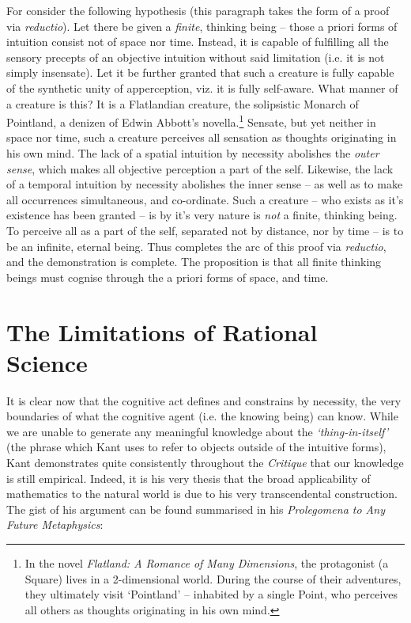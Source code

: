 \noindent
For consider the following hypothesis (this paragraph takes the form of a proof via \emph{reductio}). Let there be given a \emph{finite}, thinking being -- those a priori forms of intuition consist not of space nor time. Instead, it is capable of fulfilling all the sensory precepts of an objective intuition without said limitation (i.e. it is not simply insensate). Let it be further granted that such a creature is fully capable of the synthetic unity of apperception, viz. it is fully self-aware. What manner of a creature is this? It is a Flatlandian creature, the solipsistic Monarch of Pointland, a denizen of Edwin Abbott's novella.\footnote{In the novel \emph{Flatland: A Romance of Many Dimensions}, the protagonist (a Square) lives in a 2-dimensional world. During the course of their adventures, they ultimately visit `Pointland' -- inhabited by a single Point, who perceives all others as thoughts originating in his own mind.} Sensate, but yet neither in space nor time, such a creature perceives all sensation as thoughts originating in his own mind. The lack of a spatial intuition by necessity abolishes the \emph{outer sense}, which makes all objective perception a part of the self. Likewise, the lack of a temporal intuition by necessity abolishes the inner sense -- as well as to make all occurrences simultaneous, and co-ordinate. Such a creature -- who exists as it's existence has been granted -- is by it's very nature is \emph{not} a finite, thinking being. To perceive all as a part of the self, separated not by distance, nor by time -- is to be an infinite, eternal being. Thus completes the arc of this proof via \emph{reductio}, and the demonstration is complete. The proposition is that all finite thinking beings must cognise through the a priori forms of space, and time.

\section*{The Limitations of Rational Science}
It is clear now that the cognitive act defines and constrains by necessity, the very boundaries of what the cognitive agent (i.e. the knowing being) can know. While we are unable to generate any meaningful knowledge about the \emph{`thing-in-itself'} (the phrase which Kant uses to refer to objects outside of the intuitive forms), Kant demonstrates quite consistently throughout the \emph{Critique} that our knowledge is still empirical. Indeed, it is his very thesis that the broad applicability of mathematics to the natural world is due to his very transcendental construction. The gist of his argument can be found summarised in his \emph{Prolegomena to Any Future Metaphysics}:

